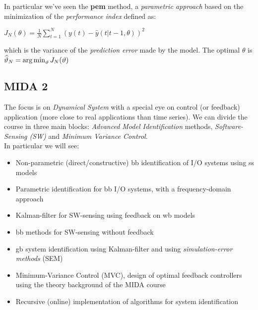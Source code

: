 In particular we've seen the \textbf{\gls{pem}} method, a \emph{parametric approach} based on the minimization of the \emph{performance index} defined as:
\begin{definition}
    $J_{N}(\theta) = \frac{1}{N} \sum_{t=1}^N \left(y(t) - \hat{y}(t|t-1, \theta)\right)^2$
\end{definition}

which is the variance of the \emph{prediction error} made by the model. The optimal $\theta$ is $\widehat{\vartheta}_N = \operatorname*{arg\,min}_\vartheta J_{N}(\vartheta)$

\subsection{MIDA 2}

The focus is on \emph{Dynamical System} with a special eye on control (or feedback) application (more close to real applications than time series). We can divide the course in three main blocks: \emph{Advanced Model Identification} methods, \emph{Software-Sensing (SW)} and \emph{Minimum Variance Control}.\\
In particular we will see: 

\begin{itemize}
    \item Non-parametric (direct/constructive) \gls{bb} identification of I/O systems using \acrlong{ss} models
    \item Parametric identification for \gls{bb} I/O systems, with a frequency-domain approach
    \item Kalman-filter for SW-sensing using feedback on \gls{wb} models
    \item \gls{bb} methods for SW-sensing without feedback
    \item \gls{gb} system identification using Kalman-filter and using \emph{simulation-error methods} (SEM)
    \item  Minimum-Variance Control (MVC), design of optimal feedback controllers using the theory background of the MIDA course
    \item Recursive (online) implementation of algorithms for system identification
\end{itemize}

